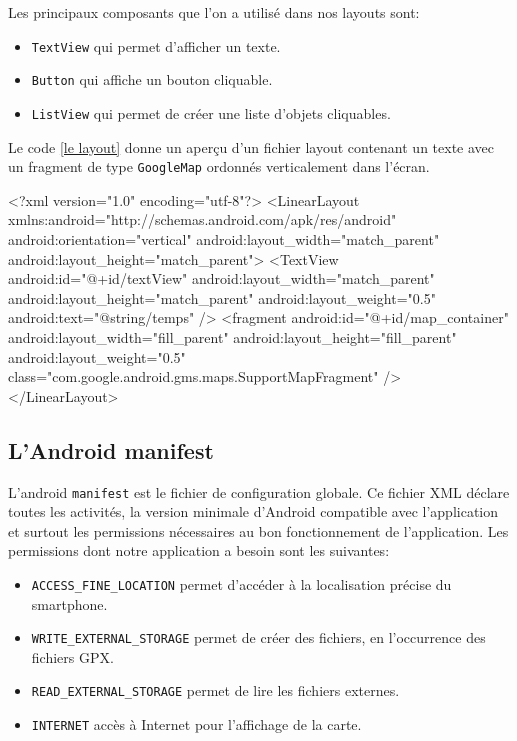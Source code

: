 Les principaux composants que l'on a utilisé dans nos layouts sont:\bigskip

\begin{itemize}
 	\item \verb!TextView! qui permet d'afficher un texte.
 	\item \verb!Button! qui affiche un bouton cliquable.
 	\item \verb!ListView! qui permet de créer une liste d'objets cliquables.
\end{itemize}\bigskip
 
Le code \ref{le layout} donne un aperçu d'un fichier layout contenant un texte avec un fragment de type \verb!GoogleMap! ordonnés verticalement dans l'écran.
\begin{xml}
<?xml version="1.0" encoding="utf-8"?>
<LinearLayout xmlns:android="http://schemas.android.com/apk/res/android"
    android:orientation="vertical" android:layout_width="match_parent"
    android:layout_height="match_parent">	
	<TextView
		android:id="@+id/textView"
    	android:layout_width="match_parent"
        android:layout_height="match_parent"        
        android:layout_weight="0.5"
        android:text="@string/temps" />
    <fragment
        android:id="@+id/map_container"
        android:layout_width="fill_parent"
        android:layout_height="fill_parent"
        android:layout_weight="0.5"
        class="com.google.android.gms.maps.SupportMapFragment" />
</LinearLayout>
\end{xml}
\label{le layout}

\subsection{L'Android manifest}
\label{manifest}

L'android \verb!manifest! est le fichier de configuration globale. Ce fichier XML déclare toutes les activités, la version minimale d'Android compatible avec l'application et surtout les permissions nécessaires au bon fonctionnement de l'application. Les permissions dont notre application a besoin sont les suivantes:\bigskip

\begin{itemize}
 	\item \verb!ACCESS_FINE_LOCATION! permet d'accéder à la localisation précise du smartphone.
 	\item \verb!WRITE_EXTERNAL_STORAGE! permet de créer des fichiers, en l'occurrence des fichiers GPX.
 	\item \verb!READ_EXTERNAL_STORAGE! permet de lire les fichiers externes.
 	\item \verb!INTERNET! accès à Internet pour l'affichage de la carte.
\end{itemize}\bigskip

